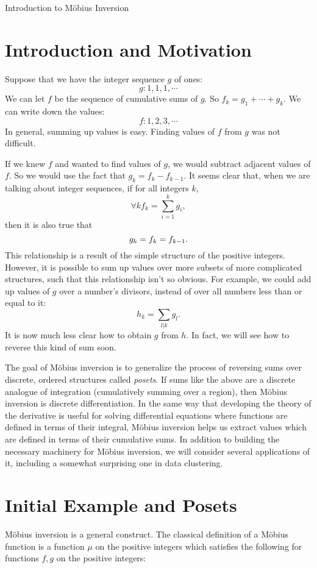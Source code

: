 \documentclass[12pt]{pom_thesis}
\begin{document}
\newpage
{}
\begin{chapter}{Introduction to M\"obius Inversion}\label{chap_intro}
\section{Introduction and Motivation}
Suppose that we have the integer sequence $g$ of ones:
\[
g : 1, 1, 1, \cdots
\]
We can let $f$ be the sequence of cumulative sums of $g$. So $f_k = g_1 + \cdots + g_k$. We can write down the values:
\[
f: 1,2,3,\cdots
\]
In general, summing up values is easy. Finding values of $f$ from $g$ was not difficult. 

If we knew $f$ and wanted to find values of $g$, we would subtract adjacent values of $f$. So we would use the fact that $g_k = f_k - f_{k-1}$. It seems clear that, when we are talking about integer sequences, if for all integers $k$,
\[
\forall k f_k = \sum_{i = 1}^k g_i,
\]
then it is also true that
\[\\
g_k = f_k = f_{k-1}.
\]
This relationship is a result of the simple structure of the positive integers. However, it is possible to sum up values over more subsets of more complicated structures, such that this relationship isn't so obvious. For example, we could add up values of $g$ over a number's divisors, instead of over all numbers less than or equal to it:
\[
h_k = \sum_{l|k}g_l.
\] 
It is now much less clear how to obtain $g$ from $h$. In fact, we will see how to reverse this kind of sum soon.

The goal of M\"obius inversion is to generalize the process of reversing sums over discrete, ordered structures called \emph{posets}. If sums like the above are a discrete analogue of integration (cumulatively summing over a region), then M\"obius inversion is discrete differentiation. In the same way that developing the theory of the derivative is useful for solving differential equations where functions are defined in terms of their integral, M\"obius inversion helps us extract values which are defined in terms of their cumulative sums. In addition to building the necessary machinery for M\"obius inversion, we will consider several applications of it, including a somewhat surprising one in data clustering.
\section{Initial Example and Posets}
M\"obius inversion is a general construct. The classical definition of a M\"obius function is a function $\mu$ on the positive integers which satisfies the following for functions $f,g$ on the positive integers:


\end{chapter}
\end{document}
